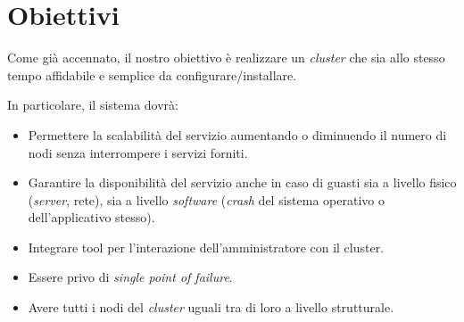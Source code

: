 
\section{Obiettivi}
Come già accennato, il nostro obiettivo è realizzare un \textit{cluster} che sia allo stesso tempo affidabile e semplice da configurare/installare.

In particolare, il sistema dovrà:
\begin{itemize}
    \item Permettere la scalabilità del servizio aumentando o diminuendo il numero di nodi senza interrompere i servizi forniti.
    \item Garantire la disponibilità del servizio anche in caso di guasti sia a livello fisico (\textit{server}, rete), sia a livello \textit{software} (\textit{crash} del sistema operativo o dell'applicativo stesso).
    \item Integrare tool per l'interazione dell'amministratore con il cluster.
    \item Essere privo di \textit{single point of failure}.
    \item Avere tutti i nodi del \textit{cluster} uguali tra di loro a livello strutturale.
\end{itemize}
